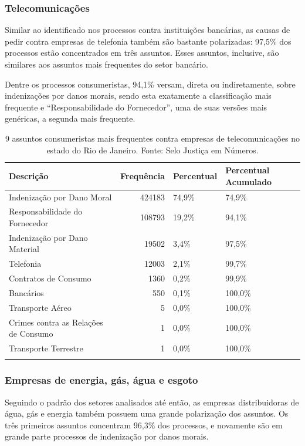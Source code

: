\documentclass[]{report}
\begin{document}
\subsubsection{Telecomunicações}\label{telecomunicacoes}

Similar ao identificado nos processos contra instituições bancárias, as
causas de pedir contra empresas de telefonia também são bastante
polarizadas: 97,5\% dos processos estão concentrados em três assuntos.
Esses assuntos, inclusive, são similares aos assuntos mais frequentes do
setor bancário.

Dentre os processos consumeristas, 94,1\% versam, direta ou
indiretamente, sobre indenizações por danos morais, sendo esta
exatamente a classificação mais frequente e ``Responsabilidade do
Fornecedor'', uma de suas versões mais genéricas, a segunda mais
frequente.

\begin{longtable}{lrll}
\caption{9 assuntos consumeristas mais frequentes contra empresas de telecomunicações no estado do Rio de Janeiro. Fonte: Selo Justiça em Números.} \\
  \hline
Descrição & Frequência & Percentual & Percentual Acumulado \\
  \hline
Indenização por Dano Moral & 424183 & 74,9\% & 74,9\% \\
  Responsabilidade do Fornecedor & 108793 & 19,2\% & 94,1\% \\
  Indenização por Dano Material & 19502 & 3,4\% & 97,5\% \\
  Telefonia & 12003 & 2,1\% & 99,7\% \\
  Contratos de Consumo & 1360 & 0,2\% & 99,9\% \\
  Bancários & 550 & 0,1\% & 100,0\% \\
  Transporte Aéreo &   5 & 0,0\% & 100,0\% \\
  Crimes contra as Relações de Consumo &   1 & 0,0\% & 100,0\% \\
  Transporte Terrestre &   1 & 0,0\% & 100,0\% \\
   \hline
\hline
\label{unnamed-chunk-24}
\end{longtable}

\subsubsection{Empresas de energia, gás, água e
esgoto}\label{empresas-de-energia-gas-agua-e-esgoto}

Seguindo o padrão dos setores analisados até então, as empresas
distribuidoras de água, gás e energia também possuem uma grande
polarização dos assuntos. Os três primeiros assuntos concentram 96,3\%
dos processos, e novamente são em grande parte processos de indenização
por danos morais.
\end{document}
